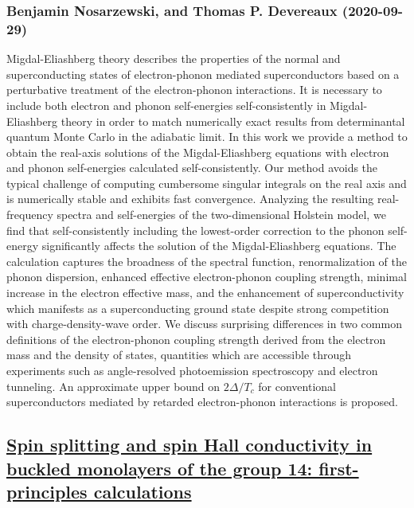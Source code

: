 \subsubsection*{Benjamin Nosarzewski, and Thomas P. Devereaux (2020-09-29)}
Migdal-Eliashberg theory describes the properties of the normal and
superconducting states of electron-phonon mediated superconductors based on a
perturbative treatment of the electron-phonon interactions. It is necessary to
include both electron and phonon self-energies self-consistently in
Migdal-Eliashberg theory in order to match numerically exact results from
determinantal quantum Monte Carlo in the adiabatic limit. In this work we
provide a method to obtain the real-axis solutions of the Migdal-Eliashberg
equations with electron and phonon self-energies calculated self-consistently.
Our method avoids the typical challenge of computing cumbersome singular
integrals on the real axis and is numerically stable and exhibits fast
convergence. Analyzing the resulting real-frequency spectra and self-energies
of the two-dimensional Holstein model, we find that self-consistently including
the lowest-order correction to the phonon self-energy significantly affects the
solution of the Migdal-Eliashberg equations. The calculation captures the
broadness of the spectral function, renormalization of the phonon dispersion,
enhanced effective electron-phonon coupling strength, minimal increase in the
electron effective mass, and the enhancement of superconductivity which
manifests as a superconducting ground state despite strong competition with
charge-density-wave order. We discuss surprising differences in two common
definitions of the electron-phonon coupling strength derived from the electron
mass and the density of states, quantities which are accessible through
experiments such as angle-resolved photoemission spectroscopy and electron
tunneling. An approximate upper bound on $2\Delta / T_c$ for conventional
superconductors mediated by retarded electron-phonon interactions is proposed.

\subsection*{\href{http://arxiv.org/abs/2009.13753v1}{Spin splitting and spin Hall conductivity in buckled monolayers of the  group 14: first-principles calculations}}
